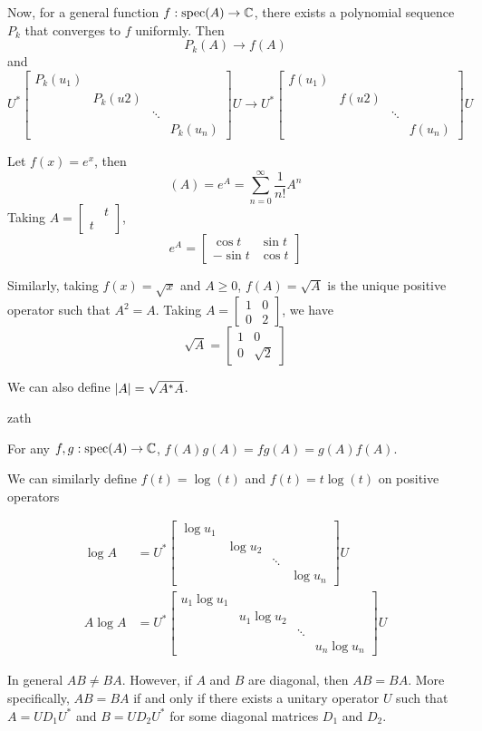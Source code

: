Now, for a general function $f:\operatorname{spec}(A) \to \mathbb{C}$, there exists a polynomial sequence
$P_k$ that converges to $f$ uniformly. Then
\[P_k(A) \to f(A)\]
and
\[U^*\begin{bmatrix}
        P_k(u_1)                       \\
         & P_k(u2)                     \\
         &         & \ddots            \\
         &         &        & P_k(u_n)
    \end{bmatrix}U\to U^*
    \begin{bmatrix}
        f(u_1)                     \\
         & f(u2)                   \\
         &       & \ddots          \\
         &       &        & f(u_n)
    \end{bmatrix}U\]

\begin{example}
    Let $f(x) = e^x$, then
    \[(A) = e^A = \sum_{n=0}^{\infty} \frac{1}{n!}A^n\]
    Taking $A = \begin{bmatrix}&t\\t\end{bmatrix}$,
    \[e^A = \begin{bmatrix}\cos{t} & \sin{t}\\-\sin{t} & \cos{t}\end{bmatrix}\]

    Similarly, taking $f(x) = \sqrt{x}$ and $A \geq 0$, $f(A) = \sqrt{A}$ is
    the unique positive operator such that $A^2 = A$. Taking $A = \begin{bmatrix}1&0\\0&2\end{bmatrix}$,
    we have
    \[\sqrt{A} = \begin{bmatrix}1&0\\0&\sqrt{2}\end{bmatrix}\]

    We can also define $\left\lvert A\right\rvert = \sqrt{A^*A}$.
\end{example}zath

For any $f, g:\operatorname{spec}(A) \to \mathbb{C}$, $f(A)g(A) = fg(A) = g(A)f(A)$.

We can similarly define $f(t) = \log(t)$ and $f(t) = t\log(t)$ on positive operators

\begin{align*}
    \log{A}  & = U^*\begin{bmatrix}\log{u_1}\\&\log{u_2}\\&&\ddots\\&&&\log{u_n}\end{bmatrix}U \\
    A\log{A} & = U^*\begin{bmatrix}u_1\log{u_1}\\&u_1\log{u_2}\\&&\ddots\\&&&u_n\log{u_n}\end{bmatrix}U
\end{align*}

In general $AB \neq BA$. However, if $A$ and $B$ are diagonal, then $AB = BA$. More specifically,
$AB = BA$ if and only if there exists a unitary operator $U$ such that $A = UD_1U^*$ and $B = UD_2U^*$
for some diagonal matrices $D_1$ and $D_2$.